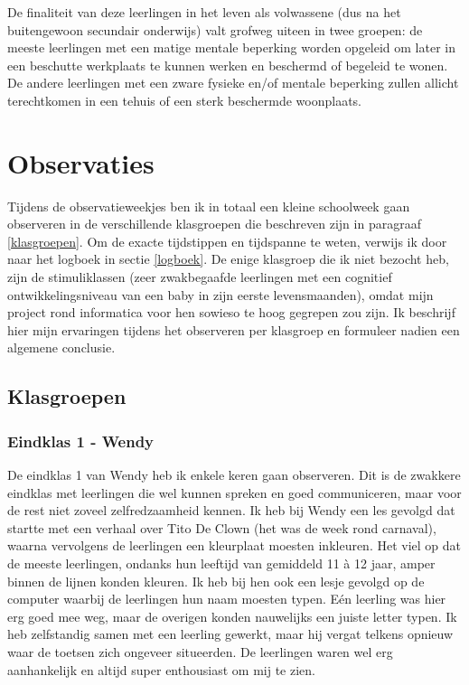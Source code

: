 \documentclass[a4paper,11pt]{article}
\theoremstyle{definition}
\begin{document}
\noindent De finaliteit van deze leerlingen in het leven als volwassene (dus na het buitengewoon secundair onderwijs) 
valt grofweg uiteen in twee groepen: de meeste leerlingen met een matige mentale 
beperking worden opgeleid om later in een beschutte werkplaats te kunnen werken 
en beschermd of begeleid te wonen. De andere leerlingen met een zware fysieke 
en/of mentale beperking zullen allicht terechtkomen in een tehuis of een sterk beschermde woonplaats. 

\newpage
\section{Observaties}\label{observaties}
Tijdens de observatieweekjes ben ik in totaal een kleine schoolweek gaan 
observeren in de verschillende klasgroepen die beschreven zijn in paragraaf \ref{klasgroepen}. Om de exacte tijdstippen en tijdspanne te weten, verwijs ik door 
naar het logboek in sectie \ref{logboek}. De enige klasgroep die ik niet bezocht 
heb, zijn de stimuliklassen (zeer zwakbegaafde leerlingen met een cognitief ontwikkelingsniveau van een baby in zijn eerste levensmaanden), omdat mijn project rond informatica voor hen sowieso 
te hoog gegrepen zou zijn. Ik beschrijf hier mijn ervaringen tijdens het 
observeren per klasgroep en formuleer nadien een algemene conclusie.

\subsection{Klasgroepen}
\subsubsection{Eindklas 1 - Wendy}
De eindklas 1 van Wendy heb ik enkele keren gaan observeren. Dit is de zwakkere 
eindklas met leerlingen die wel kunnen spreken en goed communiceren, maar voor de rest niet zoveel 
zelfredzaamheid kennen. Ik heb bij Wendy een les gevolgd dat startte met een 
verhaal over Tito De Clown (het was de week rond carnaval), waarna vervolgens de 
leerlingen een kleurplaat moesten inkleuren. Het viel op dat de meeste leerlingen, ondanks hun leeftijd van gemiddeld
11 à 12 jaar, amper binnen de lijnen konden kleuren. Ik heb bij hen ook een 
lesje gevolgd op de computer waarbij de leerlingen hun naam moesten typen. Eén 
leerling was hier erg goed mee weg, maar de overigen konden nauwelijks een 
juiste letter typen. Ik heb zelfstandig samen met een leerling gewerkt, maar hij 
vergat telkens opnieuw waar de toetsen zich ongeveer situeerden. De leerlingen 
waren wel erg aanhankelijk en altijd super enthousiast om mij te zien.
\end{document}
